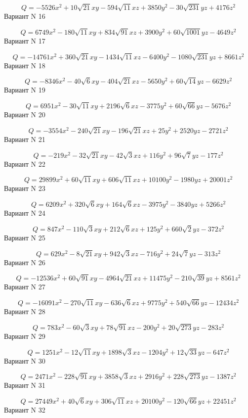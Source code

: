 \documentclass[11pt]{report}
\begin{document}
$$Q = - 5526 x^{2} + 10 \sqrt{21} x y - 594 \sqrt{11} x z + 3850 y^{2} - 30 \sqrt{231} y z + 4176 z^{2}$$Вариант N 16

$$Q = 6749 x^{2} - 180 \sqrt{11} x y + 834 \sqrt{91} x z + 3900 y^{2} + 60 \sqrt{1001} y z - 4649 z^{2}$$Вариант N 17

$$Q = - 14761 x^{2} + 360 \sqrt{21} x y - 1434 \sqrt{11} x z - 6400 y^{2} - 1080 \sqrt{231} y z + 8661 z^{2}$$Вариант N 18

$$Q = - 8346 x^{2} - 40 \sqrt{6} x y - 404 \sqrt{21} x z - 5650 y^{2} + 60 \sqrt{14} y z - 6629 z^{2}$$Вариант N 19

$$Q = 6951 x^{2} - 30 \sqrt{11} x y + 2196 \sqrt{6} x z - 3775 y^{2} + 60 \sqrt{66} y z - 5676 z^{2}$$Вариант N 20

$$Q = - 3554 x^{2} - 240 \sqrt{21} x y - 196 \sqrt{21} x z + 25 y^{2} + 2520 y z - 2721 z^{2}$$Вариант N 21

$$Q = - 219 x^{2} - 32 \sqrt{21} x y - 42 \sqrt{3} x z + 116 y^{2} + 96 \sqrt{7} y z - 177 z^{2}$$Вариант N 22

$$Q = 29899 x^{2} + 60 \sqrt{11} x y + 606 \sqrt{11} x z + 10100 y^{2} - 1980 y z + 20001 z^{2}$$Вариант N 23

$$Q = 6209 x^{2} + 320 \sqrt{6} x y + 164 \sqrt{6} x z - 3975 y^{2} - 3840 y z + 5266 z^{2}$$Вариант N 24

$$Q = 847 x^{2} - 110 \sqrt{3} x y + 212 \sqrt{6} x z + 125 y^{2} + 660 \sqrt{2} y z - 372 z^{2}$$Вариант N 25

$$Q = 629 x^{2} - 8 \sqrt{21} x y + 942 \sqrt{3} x z - 716 y^{2} + 24 \sqrt{7} y z - 313 z^{2}$$Вариант N 26

$$Q = - 12536 x^{2} + 60 \sqrt{91} x y - 4964 \sqrt{21} x z + 11475 y^{2} - 210 \sqrt{39} y z + 8561 z^{2}$$Вариант N 27

$$Q = - 16091 x^{2} - 270 \sqrt{11} x y - 636 \sqrt{6} x z + 9775 y^{2} + 540 \sqrt{66} y z - 12434 z^{2}$$Вариант N 28

$$Q = 783 x^{2} - 60 \sqrt{3} x y + 78 \sqrt{91} x z - 200 y^{2} + 20 \sqrt{273} y z - 283 z^{2}$$Вариант N 29

$$Q = 1251 x^{2} - 12 \sqrt{11} x y + 1898 \sqrt{3} x z - 1204 y^{2} + 12 \sqrt{33} y z - 647 z^{2}$$Вариант N 30

$$Q = 2471 x^{2} - 228 \sqrt{91} x y + 3858 \sqrt{3} x z + 2916 y^{2} + 228 \sqrt{273} y z - 1387 z^{2}$$Вариант N 31

$$Q = 27449 x^{2} + 40 \sqrt{6} x y + 306 \sqrt{11} x z + 20100 y^{2} - 120 \sqrt{66} y z + 22451 z^{2}$$Вариант N 32
\end{document}
